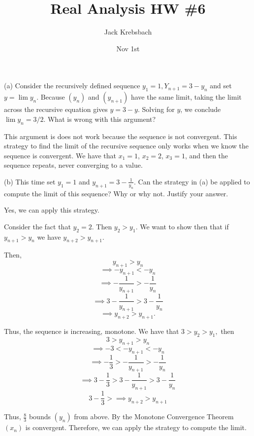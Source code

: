 \documentclass{report}
\title{Real Analysis HW \#6}
\author{Jack Krebsbach }
\date{Nov 1st}
\begin{document}
\maketitle


(a) Consider the recursively defined sequence $y_1=1, Y_{n+1}=3-y_n$ and set $y=\lim y_n$. Because $\left(y_n\right)$ and $\left(y_{n+1}\right)$ have the same limit, taking the limit across the recursive equation gives $y=3-y$. Solving for $y$, we conclude $\lim y_n=3 / 2$. What is wrong with this argument?

\bigskip
\sol

This argument is does not work because the sequence is not convergent. This strategy to find the limit of the recursive sequence only works when we know the sequence is convergent. We have that $x_1 = 1$, $x_2 = 2$, $x_3 = 1$, and then the sequence repeats, never converging to a value.

\bigskip

\bigskip
(b) This time set $y_1=1$ and $y_{n+1}=3-\frac{1}{y_n}$. Can the strategy in (a) be applied to compute the limit of this sequence? Why or why not. Justify your answer.

\bigskip
\sol 

Yes, we can apply this strategy. 

Consider the fact that $y_2 = 2$. Then $y_2 > y_1$. We want to show then that if $y_{n+1} > y_{n}$ we have $y_{n+2} > y_{n+1}.$ 

Then,
$$y_{n+1}>y_n $$ $$ \implies -y_{n+1}<-y_{n} $$ $$ \implies-\frac{1}{y_{n+1}}>-\frac{1}{y_n} $$ $$ \implies3-\frac{1}{y_{n+1}}>3-\frac{1}{y_n} $$ $$ \implies y_{n+2}>y_{n+1}.$$

Thus, the sequence is increasing, monotone.
We have that $3 > y_2 > y_1,$ then
$$3 > y_{n+1}>y_n $$ $$ \implies -3 < -y_{n+1}<-y_{n} $$ $$ \implies-\frac{1}{3}> -\frac{1}{y_{n+1}}>-\frac{1}{y_n} $$ $$  \implies 3 - \frac{1}{3} >  3-\frac{1}{y_{n+1}}>3-\frac{1}{y_n} $$ $$ 3 - \frac{1}{3} >\implies y_{n+2}>y_{n+1}$$

Thus, $\frac{8}{3}$ bounds $(y_n)$ from above. By the Monotone Convergence Theorem $(x_n)$ is convergent. Therefore, we can apply the strategy to compute the limit.

\pagebreak

\bigskip
\bigskip

\end{document}
